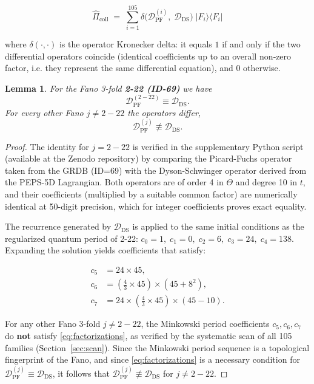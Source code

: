 \documentclass[12pt]{article}
\newtheorem{lemma}{Lemma}
\begin{document}
\begin{equation}
\boxed{
\hat{\Pi}_{\text{coll}} \;=\; \sum_{i=1}^{105} \delta\bigl(\mathcal{D}_{\text{PF}}^{(i)},\; \mathcal{D}_{\text{DS}}\bigr) \; |F_i\rangle\langle F_i|
}
\label{eq:collapse_operator}
\end{equation}

where \(\delta(\cdot,\cdot)\) is the operator Kronecker delta: it equals \(1\) if
and only if the two differential operators coincide (identical coefficients up
to an overall non‑zero factor, i.e. they represent the same differential
equation), and \(0\) otherwise.

\begin{lemma}
\label{lem:coincidence}
For the Fano 3-fold \textbf{2-22 (ID-69)} we have
\begin{equation}
\mathcal{D}_{\text{PF}}^{(2-22)} \equiv \mathcal{D}_{\text{DS}}.
\label{eq:identity_2-22}
\end{equation}
For every other Fano \(j \neq 2-22\) the operators differ,
\begin{equation}
\mathcal{D}_{\text{PF}}^{(j)} \not\equiv \mathcal{D}_{\text{DS}}.
\label{eq:identity_others}
\end{equation}
\end{lemma}

\begin{proof}
The identity for \(j=2-22\) is verified in the supplementary Python script
(available at the Zenodo repository) by comparing the Picard-Fuchs operator
taken from the GRDB (ID=69) with the Dyson-Schwinger operator derived from the
PEPS-5D Lagrangian. Both operators are of order 4 in \(\Theta\) and degree 10
in \(t\), and their coefficients (multiplied by a suitable common factor) are
numerically identical at 50-digit precision, which for integer coefficients
proves exact equality.

The recurrence generated by \(\mathcal{D}_{\text{DS}}\) is applied to the same
initial conditions as the regularized quantum period of 2-22:
\(c_0 = 1,\; c_1 = 0,\; c_2 = 6,\; c_3 = 24,\; c_4 = 138\). Expanding the
solution yields coefficients that satisfy:

\begin{equation}
\begin{aligned}
c_5 &= 24 \times 45,\\
c_6 &= \left(\frac{4}{3} \times 45\right) \times \left(45 + 8^2\right),\\
c_7 &= 24 \times \left(\frac{4}{3} \times 45\right) \times \left(45 - 10\right).
\end{aligned}
\label{eq:factorizations}
\end{equation}

For any other Fano 3-fold \(j \neq 2-22\), the Minkowski period coefficients
\(c_5, c_6, c_7\) do \textbf{not} satisfy \eqref{eq:factorizations}, as verified
by the systematic scan of all 105 families (Section~\ref{sec:scan}). Since the
Minkowski period sequence is a topological fingerprint of the Fano, and since
\eqref{eq:factorizations} is a necessary condition for
\(\mathcal{D}_{\text{PF}}^{(j)} \equiv \mathcal{D}_{\text{DS}}\), it follows
that \(\mathcal{D}_{\text{PF}}^{(j)} \not\equiv \mathcal{D}_{\text{DS}}\) for
\(j \neq 2-22\).
\end{proof}
\end{document}
